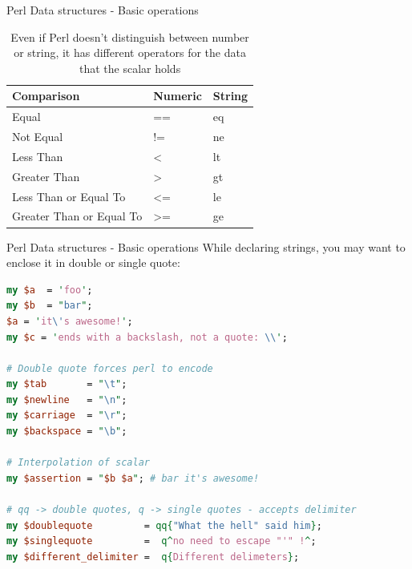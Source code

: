 \documentclass[10pt]{beamer}
\begin{document}
\begin{frame}[fragile]{Perl Data structures - Basic operations}
\begin{table}[]
\centering
\caption{Even if Perl doesn't distinguish between number or string, it has different operators for the data that the scalar holds}
\label{operators}
\begin{tabular}{lll}
\hline
{\color[HTML]{2F5361} \textbf{Comparison}} & {\color[HTML]{2F5361} \textbf{Numeric}} & {\color[HTML]{2F5361} \textbf{String}} \\ \hline
Equal                                      & ==                                      & eq                                     \\ \hline
Not Equal                                  & !=                                      & ne                                     \\ \hline
Less Than                                  & \textless                               & lt                                     \\ \hline
Greater Than                               & \textgreater                            & gt                                     \\ \hline
Less Than or Equal To                      & \textless=                              & le                                     \\ \hline
Greater Than or Equal To                   & \textgreater=                           & ge                                     \\ \hline
\end{tabular}
\end{table}
\end{frame}

\begin{frame}[fragile]{Perl Data structures - Basic operations}
While declaring strings, you may want to enclose it in double or single quote:
\begin{lstlisting}[language=perl]
my $a  = 'foo';
my $b  = "bar";
$a = 'it\'s awesome!';
my $c = 'ends with a backslash, not a quote: \\';

# Double quote forces perl to encode
my $tab       = "\t";
my $newline   = "\n";
my $carriage  = "\r";
my $backspace = "\b";

# Interpolation of scalar
my $assertion = "$b $a"; # bar it's awesome!

# qq -> double quotes, q -> single quotes - accepts delimiter
my $doublequote         = qq{"What the hell" said him};
my $singlequote         =  q^no need to escape "'" !^;
my $different_delimiter =  q{Different delimeters};
\end{lstlisting}

\end{frame}
\end{document}
